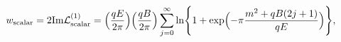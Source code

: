 \begin{equation}
w_{\rm scalar} = 2 {\rm Im} {\cal L}^{(1)}_{\rm scalar}
= \Bigl(\frac{qE}{2 \pi} \Bigr) \Bigl(\frac{qB}{2 \pi} \Bigr)
 \sum_{j = 0}^{\infty}  
\ln \Biggl\{ 1 + \exp \Bigl(-  \pi \frac{m^2 
+ qB (2 j+1)}{qE} \Bigr) \Biggr\}, \label{b-p}
\end{equation}

